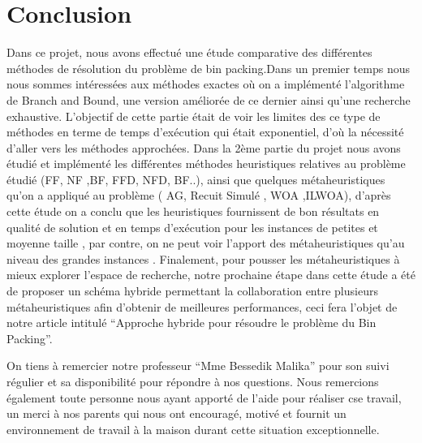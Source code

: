 \documentclass[12pt,a4paper, titlepage]{report}
\begin{document}
    \part{Conclusion}
    Dans ce projet, nous avons effectué une étude comparative des différentes méthodes de résolution du problème de bin packing.Dans un premier temps nous nous sommes intéressées aux méthodes exactes où on a implémenté l’algorithme de Branch and Bound, une version améliorée de ce dernier ainsi qu’une recherche exhaustive. L’objectif de cette partie était de voir les limites des ce type de méthodes en terme de temps d'exécution qui était exponentiel, d’où  la nécessité d’aller vers les méthodes approchées. 
    Dans la 2ème partie du projet nous avons étudié et implémenté les différentes méthodes heuristiques relatives au problème étudié (FF, NF ,BF, FFD, NFD, BF..), ainsi que quelques métaheuristiques qu’on a appliqué au problème ( AG, Recuit Simulé , WOA ,ILWOA), d’après cette étude on a conclu que  les heuristiques fournissent de bon résultats en qualité de solution et en temps d'exécution pour les instances de petites et moyenne taille , par contre, on ne peut voir l’apport des métaheuristiques qu’au niveau des grandes instances .
    Finalement, pour pousser les métaheuristiques à mieux explorer l’espace de recherche, notre prochaine étape dans cette étude a été de proposer un schéma hybride permettant la collaboration entre plusieurs métaheuristiques afin d’obtenir de meilleures performances, ceci fera l’objet de notre article intitulé “Approche hybride pour résoudre le problème du Bin Packing”.

    On tiens à remercier notre professeur “Mme Bessedik Malika” pour son suivi régulier et sa disponibilité pour répondre à nos questions. Nous remercions également toute personne nous ayant apporté de l’aide pour réaliser cse travail, un merci à nos parents qui nous ont encouragé, motivé et fournit un environnement de travail à la maison durant cette situation exceptionnelle. 
\end{document}
